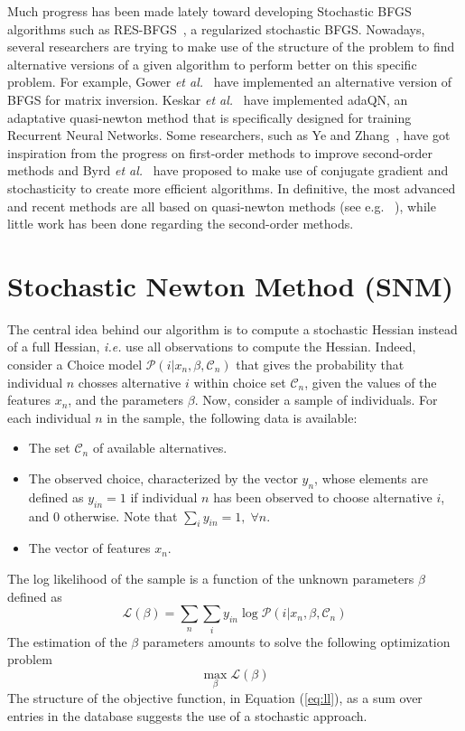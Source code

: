 \documentclass[conference]{IEEEtran}
\begin{document}
Much progress has been made lately toward developing Stochastic BFGS algorithms such as RES-BFGS~\cite{mokhtari_res:_2014}, a regularized stochastic BFGS. Nowadays, several researchers are trying to make use of the structure of the problem to find alternative versions of a given algorithm to perform better on this specific problem. For example, Gower {\it et al.}~\cite{gower_accelerated_2018} have implemented an alternative version of BFGS for matrix inversion. Keskar {\it et al.}~\cite{keskar_adaqn:_2016} have implemented adaQN, an adaptative quasi-newton method that is specifically designed for training Recurrent Neural Networks. Some researchers, such as Ye and Zhang~\cite{ye_nestrovs_2017}, have got inspiration from the progress on first-order methods to improve second-order methods and Byrd {\it et al.}~\cite{byrd_use_2011} have proposed to make use of conjugate gradient and stochasticity to create more efficient algorithms. In definitive, the most advanced and recent methods are all based on quasi-newton methods (see e.g. ~\cite{kiros_training_2013,bordes_sgd-qn:_2009,bordes_erratum:_2010,agarwal_second-order_2016}), while little work has been done regarding the second-order methods.

\section{Stochastic Newton Method (SNM)}
\label{sec:snm}

The central idea behind our algorithm is to compute a stochastic Hessian instead of a full Hessian, {\it i.e.} use all observations to compute the Hessian. Indeed, consider a Choice model $\mathcal{P}(i|x_n, \beta, \mathcal{C}_n)$ that gives the probability that individual $n$ chosses alternative $i$ within choice set $\mathcal{C}_n$, given the values of the features $x_n$, and the parameters $\beta$. Now, consider a sample of individuals. For each individual $n$ in the sample, the following data is available:
\begin{itemize}
\item The set $\mathcal{C}_n$ of available alternatives.
\item The observed choice, characterized by the vector $y_n$, whose elements are defined as $y_{in}=1$ if individual $n$ has been observed to choose alternative $i$, and 0 otherwise. Note that $\sum_{i} y_{in} = 1, \;\forall n$.
\item The vector of features $x_n$.
\end{itemize}
The log likelihood of the sample is a function of the unknown parameters $\beta$ defined as 
\begin{equation}
\label{eq:ll}
\mathcal{L}(\beta) = \sum_n \sum_i y_{in} \log \mathcal{P}(i|x_n, \beta, \mathcal{C}_n)
\end{equation}
The estimation of the $\beta$ parameters amounts to solve the following optimization problem
\begin{equation}
\label{eq:opt}
\max_{\beta} \mathcal{L}(\beta)
\end{equation} 
The structure of the objective function, in Equation (\ref{eq:ll}), as a sum over entries in the database suggests the use of a stochastic approach.
\end{document}
